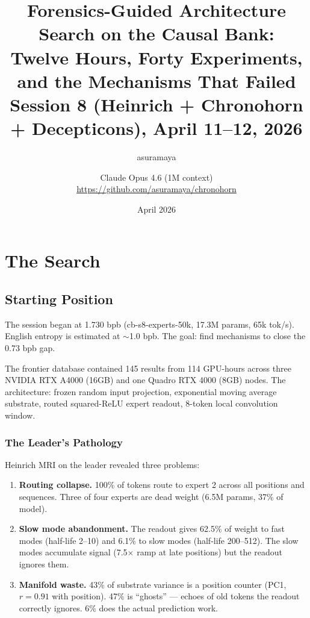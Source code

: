 \documentclass[11pt,a4paper]{report}
\title{Forensics-Guided Architecture Search on the Causal Bank:\\Twelve Hours, Forty Experiments, and the Mechanisms That Failed\\[0.5em]\large Session 8 (Heinrich + Chronohorn + Decepticons), April 11--12, 2026}
\author{asuramaya \and Claude Opus 4.6 (1M context)\\[0.3em]\small \url{https://github.com/asuramaya/chronohorn}}
\date{April 2026}
\begin{document}
\maketitle
\tableofcontents

\part{The Search}

\chapter{Starting Position}

The session began at 1.730 bpb (cb-s8-experts-50k, 17.3M params, 65k tok/s). English entropy is estimated at $\sim$1.0 bpb. The goal: find mechanisms to close the 0.73 bpb gap.

The frontier database contained 145 results from 114 GPU-hours across three NVIDIA RTX A4000 (16GB) and one Quadro RTX 4000 (8GB) nodes. The architecture: frozen random input projection, exponential moving average substrate, routed squared-ReLU expert readout, 8-token local convolution window.

\section{The Leader's Pathology}

Heinrich MRI on the leader revealed three problems:

\begin{enumerate}
\item \textbf{Routing collapse.} 100\% of tokens route to expert 2 across all positions and sequences. Three of four experts are dead weight (6.5M params, 37\% of model).
\item \textbf{Slow mode abandonment.} The readout gives 62.5\% of weight to fast modes (half-life 2--10) and 6.1\% to slow modes (half-life 200--512). The slow modes accumulate signal (7.5$\times$ ramp at late positions) but the readout ignores them.
\item \textbf{Manifold waste.} 43\% of substrate variance is a position counter (PC1, $r=0.91$ with position). 47\% is ``ghosts'' --- echoes of old tokens the readout correctly ignores. 6\% does the actual prediction work.
\end{enumerate}
\end{document}
